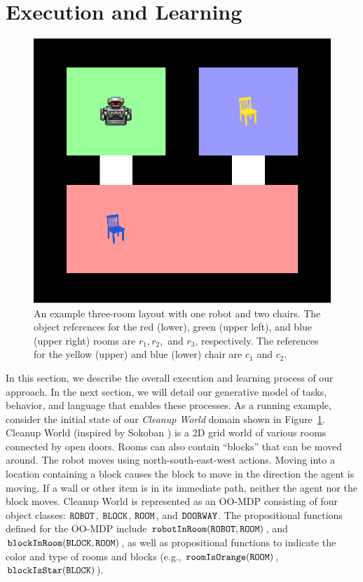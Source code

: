 \documentclass[conference]{IEEEtran}
\begin{document}
\section{Execution and Learning}
\label{sec:el}
\begin{figure}[tbp]
\begin{center}
\includegraphics[width=0.7\columnwidth]{images/exampleFloor}
\caption{\small An example three-room layout with one robot and two chairs. The object references for the red (lower), green (upper left), and blue (upper right) rooms are $r_1, r_2,$ and $r_3$, respectively. The references for the yellow (upper) and blue (lower) chair are $c_1$ and $c_2$.
}
\label{fig:ef}
\end{center}
\end{figure}
In this section, we describe the overall execution and learning process of our approach. In the next section, we will detail our generative model of tasks, behavior, and language that enables these processes. As a running example, consider the initial state of our {\em Cleanup World} domain shown in Figure~\ref{fig:ef}. Cleanup World (inspired by Sokoban \cite{junghanns1997sokoban}) is a 2D grid world of various rooms connected by open doors. Rooms can also contain ``blocks'' that can be moved around. The robot moves using north-south-east-west actions. Moving into a location containing a block causes the block to move in the direction the agent is moving. If a wall or other item is in its immediate path, neither the agent nor the block moves. Cleanup World is represented as an OO-MDP consisting of four object classes: ${\tt ROBOT}$, ${\tt BLOCK}$, ${\tt ROOM}$, and ${\tt DOORWAY}$.
The propositional functions defined for the OO-MDP include ${\tt robotInRoom}({\tt ROBOT}, {\tt ROOM})$, and ${\tt blockInRoom}({\tt BLOCK}, {\tt ROOM})$, as well as propositional functions to indicate the color and type of rooms and blocks (e.g., ${\tt roomIsOrange}({\tt ROOM})$, ${\tt blockIsStar}({\tt BLOCK})$).
\end{document}
